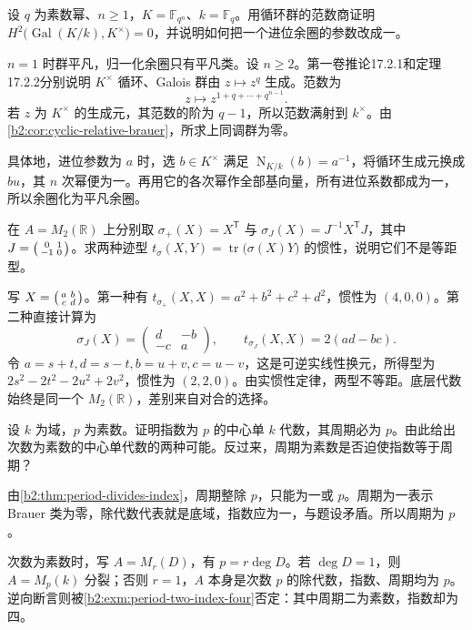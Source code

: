 \begin{exercise}\label{b2:ex:18-finite-field-cocycles}
	设 \(q\) 为素数幂、\(n\ge1\)，\(K=\mathbb F_{q^n}\)、\(k=\mathbb F_q\)。用循环群的范数商证明 \(H^2\bigl(\operatorname{Gal}(K/k),K^\times\bigr)=0\)，并说明如何把一个进位余圈的参数改成一。
\end{exercise}
\begin{solution}
	\(n=1\) 时群平凡，归一化余圈只有平凡类。设 \(n\ge2\)。第一卷推论17.2.1和定理17.2.2分别说明 \(K^\times\) 循环、Galois 群由 \(z\mapsto z^q\) 生成。范数为
	\[
		z\longmapsto z^{1+q+\cdots+q^{n-1}}.
	\]
	若 \(z\) 为 \(K^\times\) 的生成元，其范数的阶为 \(q-1\)，所以范数满射到 \(k^\times\)。由\cref{b2:cor:cyclic-relative-brauer}，所求上同调群为零。

	具体地，进位参数为 \(a\) 时，选 \(b\in K^\times\) 满足 \(\operatorname{N}_{K/k}(b)=a^{-1}\)，将循环生成元换成 \(bu\)，其 \(n\) 次幂便为一。再用它的各次幂作全部基向量，所有进位系数都成为一，所以余圈化为平凡余圈。
\end{solution}

\begin{exercise}\label{b2:ex:18-two-involution-trace-forms}
	在 \(A=M_2(\mathbb R)\) 上分别取 \(\sigma_+(X)=X^{\mathsf T}\) 与 \(\sigma_J(X)=J^{-1}X^{\mathsf T}J\)，其中 \(J=\begin{psmallmatrix}0&1\\-1&0\end{psmallmatrix}\)。求两种迹型 \(t_\sigma(X,Y)=\operatorname{tr}\bigl(\sigma(X)Y\bigr)\) 的惯性，说明它们不是等距型。
\end{exercise}
\begin{solution}
	写 \(X=\begin{psmallmatrix}a&b\\c&d\end{psmallmatrix}\)。第一种有 \(t_{\sigma_+}(X,X)=a^2+b^2+c^2+d^2\)，惯性为 \((4,0,0)\)。第二种直接计算为
	\[
		\sigma_J(X)=\begin{pmatrix}d&-b\\-c&a\end{pmatrix},\qquad
		t_{\sigma_J}(X,X)=2(ad-bc).
	\]
	令 \(a=s+t,d=s-t,b=u+v,c=u-v\)，这是可逆实线性换元，所得型为 \(2s^2-2t^2-2u^2+2v^2\)，惯性为 \((2,2,0)\)。由实惯性定律，两型不等距。底层代数始终是同一个 \(M_2(\mathbb R)\)，差别来自对合的选择。
\end{solution}

\begin{exercise}\label{b2:ex:18-prime-index-period}
	设 \(k\) 为域，\(p\) 为素数。证明指数为 \(p\) 的中心单 \(k\) 代数，其周期必为 \(p\)。由此给出次数为素数的中心单代数的两种可能。反过来，周期为素数是否迫使指数等于周期？
\end{exercise}
\begin{solution}
	由\cref{b2:thm:period-divides-index}，周期整除 \(p\)，只能为一或 \(p\)。周期为一表示 Brauer 类为零，除代数代表就是底域，指数应为一，与题设矛盾。所以周期为 \(p\)。

	次数为素数时，写 \(A=M_r(D)\)，有 \(p=r\deg D\)。若 \(\deg D=1\)，则 \(A=M_p(k)\) 分裂；否则 \(r=1\)，\(A\) 本身是次数 \(p\) 的除代数，指数、周期均为 \(p\)。逆向断言则被\cref{b2:exm:period-two-index-four}否定：其中周期二为素数，指数却为四。
\end{solution}
